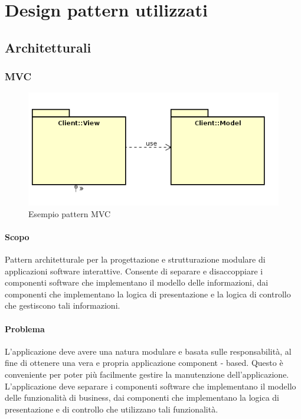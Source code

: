 \documentclass[../PianoDiQualifica.tex]{subfiles}
\begin{document}
	\section{Design pattern utilizzati}
		\subsection{Architetturali}
			\subsubsection{MVC}
					\begin{figure}[H] \label{fig:MVC}
					\centering
					\includegraphics[scale=0.8]{Immagini/MVC.png}
					\caption{Esempio pattern MVC}
				\end{figure}
				\paragraph{Scopo\\}
				Pattern architetturale per la progettazione e strutturazione modulare di applicazioni software interattive.
				Consente di separare e disaccoppiare i componenti software che implementano il modello delle informazioni, dai
				componenti che implementano la logica di presentazione e la logica di controllo che gestiscono tali informazioni. 
				\paragraph{Problema\\}
				L'applicazione deve avere una natura modulare e basata sulle responsabilità, al fine di ottenere una vera e propria applicazione component - based. Questo è conveniente per poter più facilmente gestire la manutenzione dell'applicazione. \\
				L'applicazione deve separare i componenti software che implementano il modello delle funzionalità di business, dai componenti che implementano la logica di presentazione e di controllo che utilizzano tali funzionalità.
\end{document}
